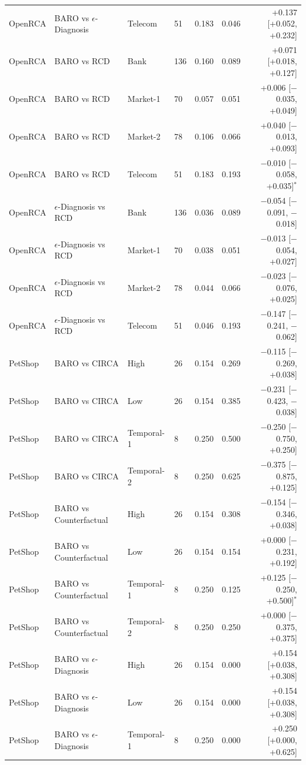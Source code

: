 {\begin{longtable}{llllrrr}
OpenRCA & BARO vs $\epsilon$-Diagnosis & Telecom & 51 & 0.183 & 0.046 & +0.137 [+0.052, +0.232] \\
OpenRCA & BARO vs RCD & Bank & 136 & 0.160 & 0.089 & +0.071 [+0.018, +0.127] \\
OpenRCA & BARO vs RCD & Market-1 & 70 & 0.057 & 0.051 & +0.006 [$-$0.035, +0.049] \\
OpenRCA & BARO vs RCD & Market-2 & 78 & 0.106 & 0.066 & +0.040 [$-$0.013, +0.093] \\
OpenRCA & BARO vs RCD & Telecom & 51 & 0.183 & 0.193 & $-$0.010 [$-$0.058, +0.035]$^\ast$ \\
OpenRCA & $\epsilon$-Diagnosis vs RCD & Bank & 136 & 0.036 & 0.089 & $-$0.054 [$-$0.091, $-$0.018] \\
OpenRCA & $\epsilon$-Diagnosis vs RCD & Market-1 & 70 & 0.038 & 0.051 & $-$0.013 [$-$0.054, +0.027] \\
OpenRCA & $\epsilon$-Diagnosis vs RCD & Market-2 & 78 & 0.044 & 0.066 & $-$0.023 [$-$0.076, +0.025] \\
OpenRCA & $\epsilon$-Diagnosis vs RCD & Telecom & 51 & 0.046 & 0.193 & $-$0.147 [$-$0.241, $-$0.062] \\
PetShop & BARO vs CIRCA & High & 26 & 0.154 & 0.269 & $-$0.115 [$-$0.269, +0.038] \\
PetShop & BARO vs CIRCA & Low & 26 & 0.154 & 0.385 & $-$0.231 [$-$0.423, $-$0.038] \\
PetShop & BARO vs CIRCA & Temporal-1 & 8 & 0.250 & 0.500 & $-$0.250 [$-$0.750, +0.250] \\
PetShop & BARO vs CIRCA & Temporal-2 & 8 & 0.250 & 0.625 & $-$0.375 [$-$0.875, +0.125] \\
PetShop & BARO vs Counterfactual & High & 26 & 0.154 & 0.308 & $-$0.154 [$-$0.346, +0.038] \\
PetShop & BARO vs Counterfactual & Low & 26 & 0.154 & 0.154 & +0.000 [$-$0.231, +0.192] \\
PetShop & BARO vs Counterfactual & Temporal-1 & 8 & 0.250 & 0.125 & +0.125 [$-$0.250, +0.500]$^\ast$ \\
PetShop & BARO vs Counterfactual & Temporal-2 & 8 & 0.250 & 0.250 & +0.000 [$-$0.375, +0.375] \\
PetShop & BARO vs $\epsilon$-Diagnosis & High & 26 & 0.154 & 0.000 & +0.154 [+0.038, +0.308] \\
PetShop & BARO vs $\epsilon$-Diagnosis & Low & 26 & 0.154 & 0.000 & +0.154 [+0.038, +0.308] \\
PetShop & BARO vs $\epsilon$-Diagnosis & Temporal-1 & 8 & 0.250 & 0.000 & +0.250 [+0.000, +0.625] \\

\end{longtable}}

